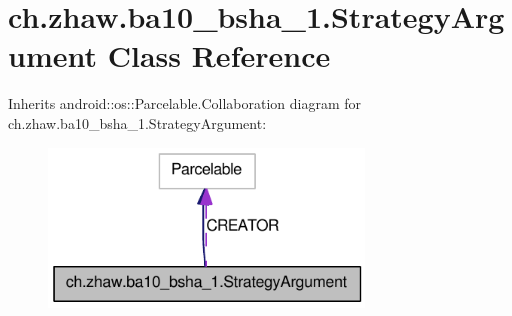 \hypertarget{classch_1_1zhaw_1_1ba10__bsha__1_1_1StrategyArgument}{
\section{ch.zhaw.ba10\_\-bsha\_\-1.StrategyArgument Class Reference}
\label{classch_1_1zhaw_1_1ba10__bsha__1_1_1StrategyArgument}
}


Inherits android::os::Parcelable.Collaboration diagram for ch.zhaw.ba10\_\-bsha\_\-1.StrategyArgument:\nopagebreak
\begin{figure}[H]
\begin{center}
\leavevmode
\includegraphics[width=238pt]{classch_1_1zhaw_1_1ba10__bsha__1_1_1StrategyArgument__coll__graph}
\end{center}
\end{figure}
